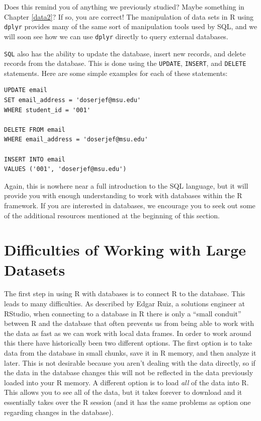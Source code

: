 \documentclass[
]{krantz}
\begin{document}
Does this remind you of anything we previously studied? Maybe something in Chapter \ref{data2}? If so, you are correct! The manipulation of data sets in R using \texttt{dplyr} provides many of the same sort of manipulation tools used by SQL, and we will soon see how we can use \texttt{dplyr} directly to query external databases.

\texttt{SQL} also has the ability to update the database, insert new records, and delete records from the database. This is done using the \texttt{UPDATE}, \texttt{INSERT}, and \texttt{DELETE} statements. Here are some simple examples for each of these statements:

\begin{verbatim}
UPDATE email
SET email_address = 'doserjef@msu.edu'
WHERE student_id = '001'

DELETE FROM email
WHERE email_address = 'doserjef@msu.edu'

INSERT INTO email
VALUES ('001', 'doserjef@msu.edu')
\end{verbatim}

Again, this is nowhere near a full introduction to the SQL language, but it will provide you with enough understanding to work with databases within the R framework. If you are interested in databases, we encourage you to seek out some of the additional resources mentioned at the beginning of this section.

\hypertarget{difficulties-of-working-with-large-datasets}{%
\section{Difficulties of Working with Large Datasets}\label{difficulties-of-working-with-large-datasets}}

The first step in using R with databases is to connect R to the database. This leads to many difficulties. As described by Edgar Ruiz, a solutions engineer at RStudio, when connecting to a database in R there is only a ``small conduit'' between R and the database that often prevents us from being able to work with the data as fast as we can work with local data frames. In order to work around this there have historically been two different options. The first option is to take data from the database in small chunks, save it in R memory, and then analyze it later. This is not desirable because you aren't dealing with the data directly, so if the data in the database changes this will not be reflected in the data previously loaded into your R memory. A different option is to load \emph{all} of the data into R. This allows you to see all of the data, but it takes forever to download and it essentially takes over the R session (and it has the same problems as option one regarding changes in the database).
\end{document}
